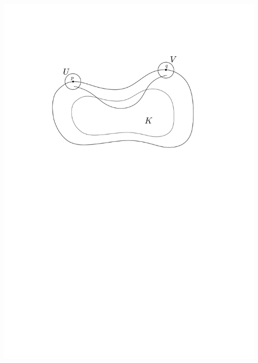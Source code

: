 \begin{frame}[t]
{    \includegraphics[width=1.05\textwidth, trim=0 18cm 0 3cm]{vis2.png}
  }
\end{frame}
